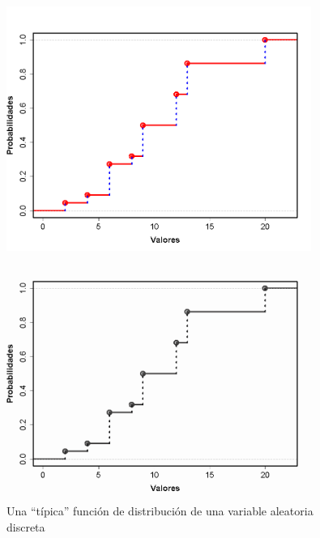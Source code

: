     \begin{figure}[htb]
	\centering
	\begin{enColor}
    \includegraphics[height=8cm]{../fig/Cap04-FuncionDistribucionVariableAleatoria.png}
	\end{enColor}
	\begin{bn}
    \includegraphics[height=8cm]{../fig/Cap04-FuncionDistribucionVariableAleatoria-bn.png}
	\end{bn}
	\caption{Una ``típica'' función de distribución de una variable aleatoria discreta}
	\label{cap04:fig:GraficaFuncionDistribucionVariableAleatoriaDiscreta}
    \end{figure}

